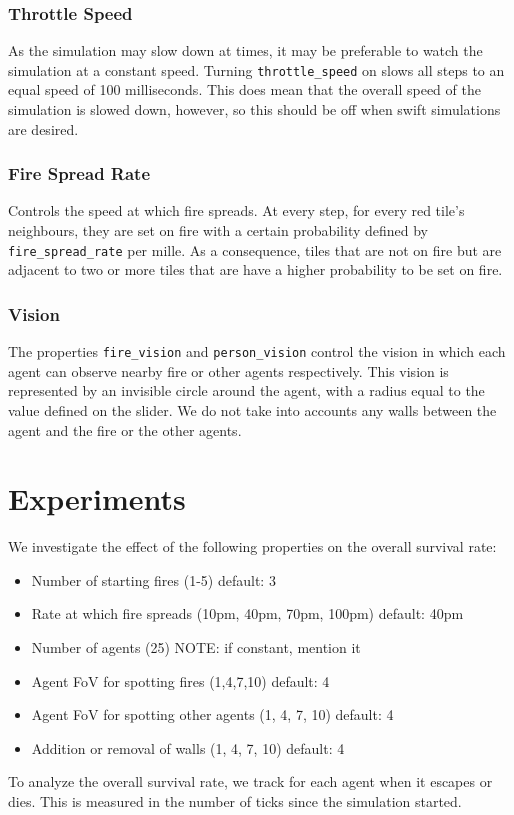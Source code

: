 \documentclass[a4paper]{article}
\begin{document}
\subsubsection{Throttle Speed}
As the simulation may slow down at times, it may be preferable to watch the simulation at a constant speed. Turning \texttt{throttle\_speed} on slows all steps to an equal speed of 100 milliseconds. This does mean that the overall speed of the simulation is slowed down, however, so this should be off when swift simulations are desired.

\subsubsection{Fire Spread Rate}
Controls the speed at which fire spreads. At every step, for every red tile's neighbours, they are set on fire with a certain probability defined by \texttt{fire\_spread\_rate} per mille. As a consequence, tiles that are not on fire but are adjacent to two or more tiles that are have a higher probability to be set on fire.

\subsubsection{Vision}
The properties \texttt{fire\_vision} and \texttt{person\_vision} control the vision in which each agent can observe nearby fire or other agents respectively. This vision is represented by an invisible circle around the agent, with a radius equal to the value defined on the slider. We do not take into accounts any walls between the agent and the fire or the other agents.

\FloatBarrier
\section{Experiments}
We investigate the effect of the following properties on the overall survival rate:
\begin{itemize}
\item Number of starting fires (1-5) default: 3
\item Rate at which fire spreads (10pm, 40pm, 70pm, 100pm) default: 40pm
\item Number of agents (25) NOTE: if constant, mention it
\item Agent FoV for spotting fires (1,4,7,10) default: 4
\item Agent FoV for spotting other agents (1, 4, 7, 10) default: 4
\item Addition or removal of walls (1, 4, 7, 10) default: 4
\end{itemize}
To analyze the overall survival rate, we track for each agent when it escapes or dies. This is measured in the number of ticks since the simulation started. 
\end{document}
